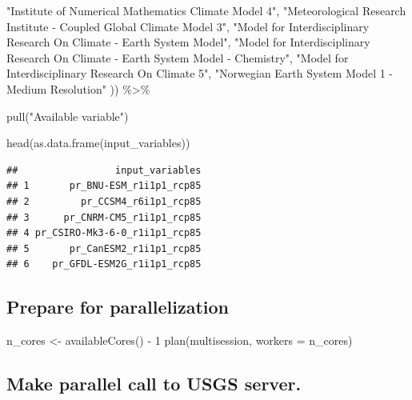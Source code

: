 \documentclass[
  paper=a4,
  ,captions=tableheading
]{scrartcl}
\newenvironment{Shaded}{\begin{snugshade}}{\end{snugshade}}
\newcommand{\AttributeTok}[1]{\textcolor[rgb]{0.77,0.63,0.00}{#1}}
\newcommand{\DecValTok}[1]{\textcolor[rgb]{0.00,0.00,0.81}{#1}}
\newcommand{\FunctionTok}[1]{\textcolor[rgb]{0.00,0.00,0.00}{#1}}
\newcommand{\NormalTok}[1]{#1}
\newcommand{\OtherTok}[1]{\textcolor[rgb]{0.56,0.35,0.01}{#1}}
\newcommand{\SpecialCharTok}[1]{\textcolor[rgb]{0.00,0.00,0.00}{#1}}
\newcommand{\StringTok}[1]{\textcolor[rgb]{0.31,0.60,0.02}{#1}}
\begin{document}
\begin{Shaded}
\begin{Highlighting}[]
 \StringTok{"Institute of Numerical Mathematics Climate Model 4"}\NormalTok{,                                           }
 \StringTok{"Meteorological Research Institute {-} Coupled Global Climate Model 3"}\NormalTok{,                           }
 \StringTok{"Model for Interdisciplinary Research On Climate {-} Earth System Model"}\NormalTok{,                         }
 \StringTok{"Model for Interdisciplinary Research On Climate {-} Earth System Model {-} Chemistry"}\NormalTok{,             }
 \StringTok{"Model for Interdisciplinary Research On Climate 5"}\NormalTok{,                                            }
 \StringTok{"Norwegian Earth System Model 1 {-} Medium Resolution"}\NormalTok{  )) }\SpecialCharTok{\%\textgreater{}\%}
  
  \FunctionTok{pull}\NormalTok{(}\StringTok{"Available variable"}\NormalTok{)}

\FunctionTok{head}\NormalTok{(}\FunctionTok{as.data.frame}\NormalTok{(input\_variables))}
\end{Highlighting}
\end{Shaded}

\begin{verbatim}
##                 input_variables
## 1       pr_BNU-ESM_r1i1p1_rcp85
## 2         pr_CCSM4_r6i1p1_rcp85
## 3      pr_CNRM-CM5_r1i1p1_rcp85
## 4 pr_CSIRO-Mk3-6-0_r1i1p1_rcp85
## 5       pr_CanESM2_r1i1p1_rcp85
## 6    pr_GFDL-ESM2G_r1i1p1_rcp85
\end{verbatim}

\hypertarget{prepare-for-parallelization}{%
\subsection{Prepare for
parallelization}\label{prepare-for-parallelization}}

\begin{Shaded}
\begin{Highlighting}[]
\NormalTok{n\_cores }\OtherTok{\textless{}{-}} \FunctionTok{availableCores}\NormalTok{() }\SpecialCharTok{{-}} \DecValTok{1}
\FunctionTok{plan}\NormalTok{(multisession, }\AttributeTok{workers =}\NormalTok{ n\_cores)}
\end{Highlighting}
\end{Shaded}

\hypertarget{make-parallel-call-to-usgs-server.}{%
\subsection{Make parallel call to USGS
server.}\label{make-parallel-call-to-usgs-server.}}
\end{document}

